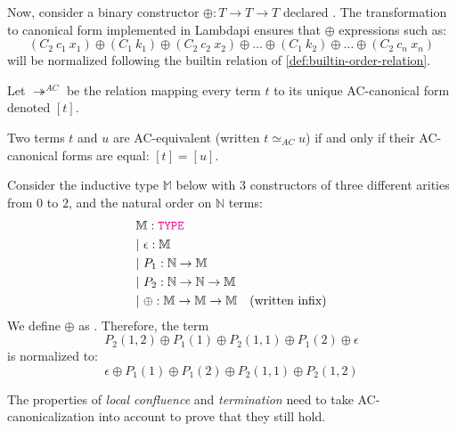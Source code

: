 Now, consider a binary constructor $\oplus: T \to T \to T$ declared .
The transformation to canonical form implemented in Lambdapi ensures that $\oplus$ expressions such as:
\[ (C_2~c_1~x_1) \oplus (C_1~k_1) \oplus (C_2~c_2~x_2) \oplus \dots \oplus (C_1~k_2) \oplus \dots \oplus (C_2~c_n~x_n) \]
will be normalized following the builtin relation of \cref{def:builtin-order-relation}.

\begin{definition}
Let $\twoheadrightarrow^{AC}$ be the relation mapping every term $t$ to its unique AC-canonical form denoted $[t]$.
\end{definition}

\begin{definition}[AC equivalence]
Two terms $t$ and $u$ are AC-equivalent (written $t \simeq_{AC} u$) if and only if their AC-canonical forms are equal: $[t] = [u]$.
\end{definition}

\begin{example}
Consider the inductive type $\mathbb{M}$ below with 3 constructors of three different arities from $0$ to $2$, and the natural order on $\mathbb{N}$ terms:
\begin{align*}
&\bb{M}: \type \\
&|~\epsilon : \bb{M} \\
&|~P_1: \N \ra \bb{M} \\
&|~P_2 : \N \ra \N \ra \bb{M} \\
&|~ \oplus : \bb{M} \to \bb{M} \to \bb{M} \quad \text{(written infix)}
\end{align*}
We define $\oplus$ as . Therefore, the term
\[
  P_2(1,2) \oplus P_1(1) \oplus P_2(1,1) \oplus P_1(2) \oplus \epsilon
\]
is normalized to:
\[
  \epsilon \oplus P_1(1) \oplus P_1(2) \oplus P_2(1,1) \oplus P_2(1,2)
\]
\end{example}

\begin{remark}
The properties of \emph{local confluence} and \emph{termination} need to take AC-canonicalization into account to prove that they still hold.
\end{remark}